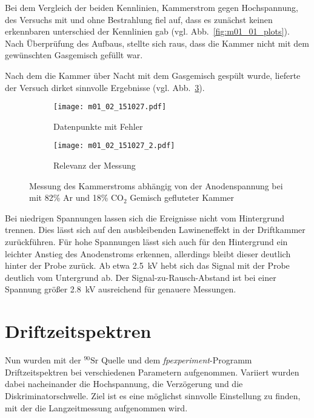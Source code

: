 \documentclass[11pt, ngerman, fleqn, DIV=15, headinclude, BCOR=2cm]{scrreprt}
\begin{document}
Bei dem Vergleich der beiden Kennlinien, Kammerstrom gegen Hochspannung,
des Versuchs mit und ohne Bestrahlung fiel auf, dass es zunächst keinen
erkennbaren unterschied der Kennlinien gab (vgl. Abb.~\ref{fig:m01_01_plots}).
Nach Überprüfung des Aufbaus, stellte sich raus, dass die Kammer nicht mit dem 
gewünschten Gasgemisch gefüllt war.

Nach dem die Kammer über Nacht mit dem Gasgemisch gespült wurde, lieferte der
Versuch dirket sinnvolle Ergebnisse (vgl. Abb.~\ref{fig:m01_02_plots}).

\begin{figure}
	\centering
	\begin{subfigure}{0.49 \linewidth}
        \texttt{[image: m01\_02\_151027.pdf]}
        \caption{%
		Datenpunkte mit Fehler
        }
        \label{fig:m01_02_messdaten}
    \end{subfigure}
    \begin{subfigure}{0.49 \linewidth}
        \texttt{[image: m01\_02\_151027\_2.pdf]}
        \caption{%
		Relevanz der Messung
       }
        \label{fig:m01_02_relevanz}
    \end{subfigure}
    \caption{%
	    Messung des Kammerstroms abhängig von der Anodenspannung bei mit
	    82\% Ar und 18\% $\text{CO}_2$ Gemisch gefluteter Kammer
    }
    \label{fig:m01_02_plots}
\end{figure}

Bei niedrigen Spannungen lassen sich die Ereignisse nicht vom Hintergrund
trennen. 
Dies lässt sich auf den ausbleibenden Lawineneffekt in der Driftkammer
zurückführen.
Für hohe Spannungen lässt sich auch für den Hintergrund ein leichter
Anstieg des Anodenstroms erkennen, allerdings bleibt dieser deutlich hinter der
Probe zurück.
Ab etwa \SI{2.5}{\kilo\volt} hebt sich das Signal mit der Probe deutlich vom
Untergrund ab. Der Signal-zu-Rausch-Abstand ist bei einer Spannung größer
\SI{2.8}{\kilo\volt} ausreichend für genauere Messungen.

\section{Driftzeitspektren}
Nun wurden mit der $^{90}\text{Sr}$ Quelle und dem \emph{fpexperiment}-Programm
Driftzeitspektren bei verschiedenen Parametern aufgenommen.
Variiert wurden dabei nacheinander die Hochspannung, die Verzögerung und die
Diskriminatorschwelle.
Ziel ist es eine möglichst sinnvolle Einstellung zu finden, mit der die
Langzeitmessung aufgenommen wird.
\end{document}
